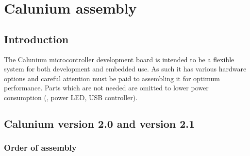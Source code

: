 \chapter{Calunium assembly}

\section{Introduction}

The Calunium microcontroller development board is intended to be a
flexible system for both development and embedded use. As such it has
various hardware options and careful attention must be paid to
assembling it for optimum performance. Parts which are not needed are
omitted to lower power consumption (\eg, power LED, USB controller).

\section{Calunium version 2.0 and version 2.1}


\subsection{Order of assembly}

